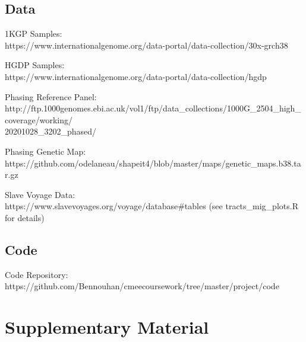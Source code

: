 \documentclass[11pt]{article}
\begin{document}
\subsection{Data}

1KGP Samples: \\
https://www.internationalgenome.org/data-portal/data-collection/30x-grch38
\vspace{3mm}

\noindent
HGDP Samples: \\
https://www.internationalgenome.org/data-portal/data-collection/hgdp
\vspace{3mm}

\noindent
Phasing Reference Panel: \\
http://ftp.1000genomes.ebi.ac.uk/vol1/ftp/data\_collections/1000G\_2504\_high\_coverage/working/\\20201028\_3202\_phased/
\vspace{3mm}

\noindent
Phasing Genetic Map: \\
https://github.com/odelaneau/shapeit4/blob/master/maps/genetic\_maps.b38.tar.gz
\vspace{3mm}

\noindent
Slave Voyage Data: \\
https://www.slavevoyages.org/voyage/database\#tables (see tracts\_mig\_plots.R for details)


\subsection{Code}

Code Repository: \\
https://github.com/Bennouhan/cmeecoursework/tree/master/project/code




\newpage
\printbibliography[heading=bibintoc]
\newpage















\section*{Supplementary Material} %
\renewcommand{\thefigure}{S\arabic{figure}}
\setcounter{figure}{0} 
\end{document}
